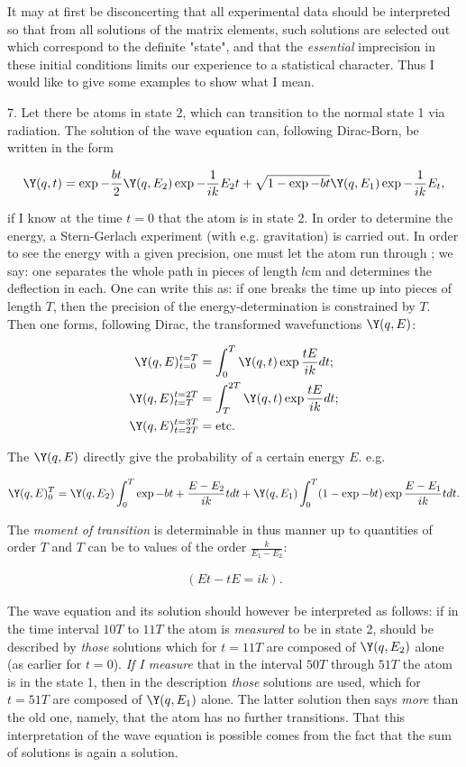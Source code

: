 \documentclass{article}
\newcommand{\uequ}[1]{
\begin{align*}
#1
\end{align*}
}
\newcommand{\intXY}[2]{\int_{#1}^{#2}}
\begin{document}
It may at first be disconcerting that all experimental data should be interpreted so that from all solutions of the matrix elements, such solutions are selected out which correspond to the definite "state", and that the \textit{essential} imprecision in these initial conditions limits our experience to a statistical character. Thus I would like to give some examples to show what I mean.

7. Let there be atoms in state 2, which can transition to the normal state 1 via radiation. The solution of the wave equation can, following Dirac-Born, be written in the form
\uequ{
\Y(q,t) = \exp{-\frac{bt}{2}}\Y(q,E_2)\exp{-\frac{1}{ik}E_2 t}
          + \sqrt{1-\exp{-bt}}\Y(q,E_1)\exp{-\frac{1}{ik}E_t},
}

if I know at the time $t=0$ that the atom is in state 2. In order to determine the energy, a Stern-Gerlach experiment (with e.g. gravitation) is carried out. In order to see the energy with a given precision, one must let the atom run through ; we say: one separates the whole path in pieces of length $l$cm and determines the deflection in each. One can write this as: if one breaks the time up into pieces of length $T$, then the precision of the energy-determination is constrained by $T$. Then one forms, following Dirac, the transformed wavefunctions $\Y(q,E)$:
\uequ{
\Y(q,E)^{t=T}_{t=0} &= \intXY{0}{T}\Y(q,t)\exp{\frac{tE}{ik}}dt;\\
\Y(q,E)^{t=2T}_{t=T} &= \intXY{T}{2T}\Y(q,t)\exp{\frac{tE}{ik}}dt;\\
\Y(q,E)^{t=3T}_{t=2T} &= \text{etc.}
}

The $\Y(q,E)$ directly give the probability of a certain energy $E$. e.g.
\uequ{
\Y(q,E)^T_0 = \Y(q,E_2)\intXY{0}{T}\exp{-bt+\frac{E-E_2}{ik}t}dt
            + \Y(q,E_1)\intXY{0}{T}(1-\exp{-bt})\exp{\frac{E-E_1}{ik}t}dt.
}

The \textit{moment of transition} is determinable in thus manner up to quantities of order
$T$ and $T$ can be  to values of the order $\frac{k}{E_1-E_2}$:
\uequ{
(Et-tE = ik).
}

The wave equation and its solution should however be interpreted as follows: if in the time interval $10T$ to $11T$ the atom is \textit{measured} to be in state 2,  should be described by \textit{those} solutions which for $t=11T$ are composed of $\Y(q,E_2)$ alone (as earlier for $t=0$). \textit{If I measure} that in the interval $50T$ through $51T$ the atom is in the state 1, then in the description  \textit{those} solutions are used, which for $t=51T$ are composed of $\Y(q,E_1)$ alone. The latter solution then says \textit{more} than the old one, namely, that the atom has no further transitions. That this interpretation of the wave equation is possible comes from the fact that the sum of solutions is again a solution.
\end{document}
